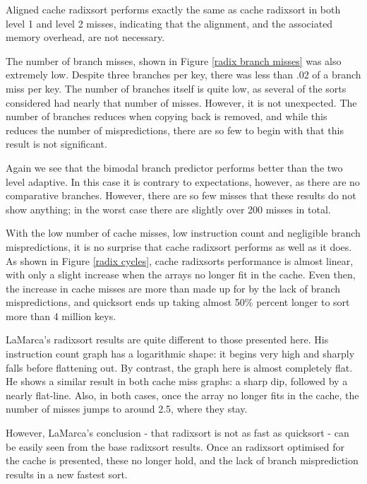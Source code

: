 Aligned cache radixsort performs exactly the same as cache radixsort in both
level 1 and level 2 misses, indicating that the alignment, and the associated
memory overhead, are not necessary.

The number of branch misses, shown in Figure \ref{radix branch misses} was also
extremely low. Despite three branches per key, there was less than .02 of a branch
miss per key. The number of branches itself is quite low, as several of the
sorts considered had nearly that number of misses. However, it is not
unexpected. The number of branches reduces when copying back is removed, and
while this reduces the number of mispredictions, there are so few to begin with
that this result is not significant.

Again we see that the bimodal branch predictor performs better than the two
level adaptive. In this case it is contrary to expectations, however, as
there are no comparative branches. However, there are so few misses that these
results do not show anything; in the worst case there are slightly over 200
misses in total.

With the low number of cache misses, low instruction count and negligible branch
mispredictions, it is no surprise that cache radixsort performs as well as it
does. As shown in Figure \ref{radix cycles}, cache radixsorts performance is
almost linear, with only a slight increase when the arrays no longer fit in the
cache.  Even then, the increase in cache misses are more than made up for by the
lack of branch mispredictions, and quicksort ends up taking almost 50\% percent
longer to sort more than 4 million keys.

LaMarca's radixsort results are quite different to those presented here. His
instruction count graph has a logarithmic shape: it begins very high and sharply
falls before flattening out. By contrast, the graph here is almost completely
flat. He shows a similar result in both cache miss graphs: a sharp dip, followed
by a nearly flat-line. Also, in both cases, once the array no longer fits in the
cache, the number of misses jumps to around 2.5, where they stay.

However, LaMarca's conclusion - that radixsort is not as fast as quicksort - can
be easily seen from the base radixsort results. Once an radixsort optimised for
the cache is presented, these no longer hold, and the lack of branch
misprediction results in a new fastest sort.

